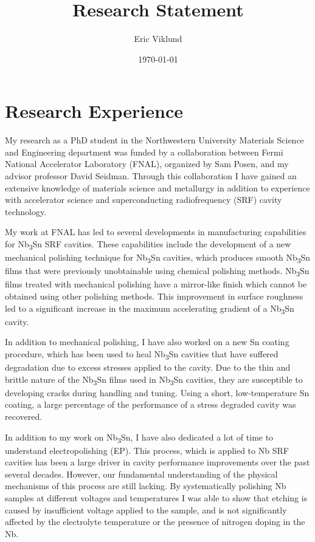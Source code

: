 \documentclass[]{revtex4-2}
\begin{document}
\title{Research Statement}
\author{Eric Viklund}


\date{\today}


\maketitle


\section{Research Experience}

    My research as a PhD student in the Northwestern University Materials Science and Engineering department was funded by a collaboration between Fermi National Accelerator Laboratory (FNAL), organized by Sam Posen, and my advisor professor David Seidman. Through this collaboration I have gained an extensive knowledge of materials science and metallurgy in addition to experience with accelerator science and superconducting radiofrequency (SRF) cavity technology. 

    My work at FNAL has led to several developments in manufacturing capabilities for Nb\textsubscript{3}Sn SRF cavities. These capabilities include the development of a new mechanical polishing technique for Nb\textsubscript{3}Sn cavities, which produces smooth Nb\textsubscript{3}Sn films that were previously unobtainable using chemical polishing methods.\cite{10.1088/1361-6668/ad0b2d} Nb\textsubscript{3}Sn films treated with mechanical polishing have a mirror-like finish which cannot be obtained using other polishing methods. This improvement in surface roughness led to a significant increase in the maximum accelerating gradient of a Nb\textsubscript{3}Sn cavity.
    
    In addition to mechanical polishing, I have also worked on a new Sn coating procedure, which has been used to heal Nb\textsubscript{3}Sn cavities that have suffered degradation due to excess stresses applied to the cavity. Due to the thin and brittle nature of the Nb\textsubscript{3}Sn films used in Nb\textsubscript{3}Sn cavities, they are susceptible to developing cracks during handling and tuning. Using a short, low-temperature Sn coating, a large percentage of the performance of a stress degraded cavity was recovered.

    In addition to my work on Nb\textsubscript{3}Sn, I have also dedicated a lot of time to understand electropolishing (EP). This process, which is applied to Nb SRF cavities has been a large driver in cavity performance improvements over the past several decades. However, our fundamental understanding of the physical mechanisms of this process are still lacking. By systematically polishing Nb samples at different voltages and temperatures I was able to show that etching is caused by insufficient voltage applied to the sample, and is not significantly affected by the electrolyte temperature or the presence of nitrogen doping in the Nb.\cite{viklund:srf2021-supcav016}
\end{document}
